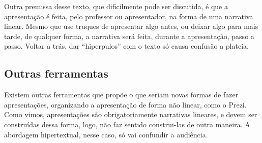 Outra premissa desse texto, que dificilmente pode ser discutida, é que a apresentação é feita, pelo professor ou apresentador, na forma de uma narrativa linear. Mesmo que use truques de apresentar algo antes, ou deixar algo para mais tarde, de qualquer forma, a narrativa será feita, durante a apresentação, passo a passo. Voltar a trás, dar ``hiperpulos'' com o texto só causa confusão a plateia.

\subsection{Outras ferramentas}

Existem outras ferramentas que propõe o que seriam novas formas de fazer apresentações, organizando a apresentação de forma não linear, como o Prezi. Como vimos, apresentações são obrigatoriamente narrativas lineares, e devem ser construídas dessa forma, logo, não faz sentido construi-las de outra maneira. A abordagem hipertextual, nesse caso, só vai confundir a audiência.